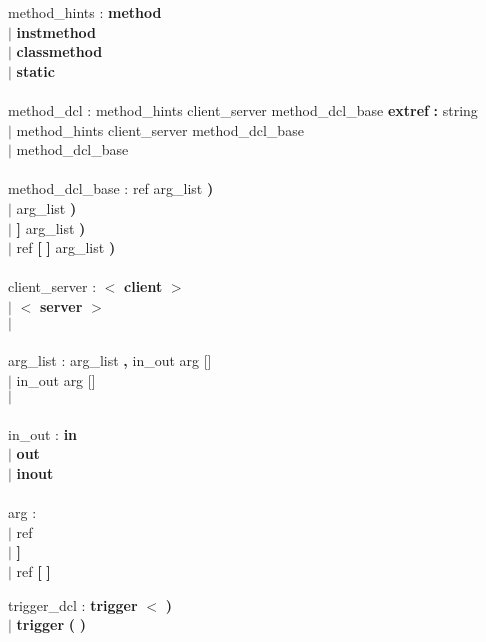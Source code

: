 \begin{tabbing}
\grindent
method\_hints \> : {\bf method}\\
\> $|$ {\bf instmethod}\\
\> $|$ {\bf classmethod}\\
\> $|$ {\bf static}\\
\\
method\_dcl \> : method\_hints client\_server method\_dcl\_base {\bf extref} {\bf :} string\\
\> $|$ method\_hints client\_server method\_dcl\_base\\
\> $|$ method\_dcl\_base\\
\\
method\_dcl\_base \> : \ident ref \ident {\bf (} arg\_list {\bf )}\\
\> $|$ \ident \ident {\bf (} arg\_list {\bf )}\\
\> $|$ \ident {\bf [} {\bf ]} \ident {\bf (} arg\_list {\bf )}\\
\> $|$ \ident ref {\bf [} {\bf ]} \ident {\bf (} arg\_list {\bf )}\\
\\
client\_server \> : {\bf $<$} {\bf client} {\bf $>$}\\
\> $|$ {\bf $<$} {\bf server} {\bf $>$}\\
\> $|$\\
\\
arg\_list \> : arg\_list {\bf ,} in\_out arg [\ident]\\
\> $|$ in\_out arg [\ident]\\
\> $|$\\
\\
in\_out \> : {\bf in}\\
\> $|$ {\bf out}\\
\> $|$ {\bf inout}\\
\\
arg \> : \ident\\
\> $|$ \ident ref\\
\> $|$ \ident {\bf [} {\bf ]}\\
\> $|$ \ident ref {\bf [} {\bf ]}
\end{tabbing}

\begin{tabbing}
\grindent
trigger\_dcl \> : {\bf trigger} {\bf $<$} \ident {\bf $>$} \ident {\bf (} {\bf )}\\
\> $|$ {\bf trigger} \ident {\bf $<$} \ident {\bf $>$} {\bf (} {\bf )}
\end{tabbing}

